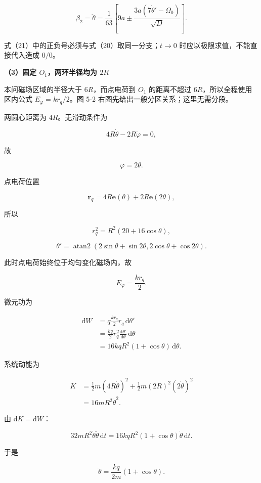 \documentclass[12pt,a4paper,UTF8]{ctexart}
\begin{document}
\[\boxed{
\beta_2=\ddot\theta
=\frac1{63}\left[
9a\pm\frac{3a(7\dot\theta'-\Omega_0)}{\sqrt D}
\right]
}. \tag{21}\]

式（21）中的正负号必须与式（20）取同一分支；\(t\to0\)
时应以极限求值，不能直接代入造成 \(0/0\)。

\textbf{（3）固定 \(O_1\)，两环半径均为 \(2R\)}

本问磁场区域的半径大于 \(6R\)，而点电荷到 \(O_1\) 的距离不超过
\(6R\)，所以全程使用区内公式 \(E_\varphi=kr_q/2\)。图 5-2
右图先给出一般分区关系；这里无需分段。

两圆心距离为 \(4R\)。无滑动条件为

\[4R\dot\theta-2R\dot\varphi=0,\]

故

\[\boxed{\varphi=2\theta}. \tag{22}\]

点电荷位置

\[\boldsymbol r_q=4R\boldsymbol e(\theta)+2R\boldsymbol e(2\theta),\]

所以

\[r_q^2=R^2(20+16\cos\theta), \tag{23}\]

\[\theta'=\operatorname{atan2}
\left(2\sin\theta+\sin2\theta,
2\cos\theta+\cos2\theta\right). \tag{24}\]

此时点电荷始终位于均匀变化磁场内，故

\[E_\varphi=\frac{kr_q}{2}.\]

微元功为

\[\begin{aligned}
\mathrm dW
&=q\frac{kr_q}{2}r_q\,\mathrm d\theta'\\
&=\frac{kq}{2}r_q^2\frac{\mathrm d\theta'}{\mathrm d\theta}\,\mathrm d\theta\\
&=16kqR^2(1+\cos\theta)\,\mathrm d\theta.
\end{aligned} \tag{25}\]

系统动能为

\[\begin{aligned}
K
&=\frac12m(4R\dot\theta)^2
+\frac12m(2R)^2(2\dot\theta)^2\\
&=16mR^2\dot\theta^2.
\end{aligned} \tag{26}\]

由 \(\mathrm dK=\mathrm dW\)：

\[32mR^2\dot\theta\ddot\theta\,\mathrm dt
=16kqR^2(1+\cos\theta)\dot\theta\,\mathrm dt.\]

于是

\[\boxed{
\ddot\theta=\frac{kq}{2m}(1+\cos\theta)
}. \tag{27}\]
\end{document}
